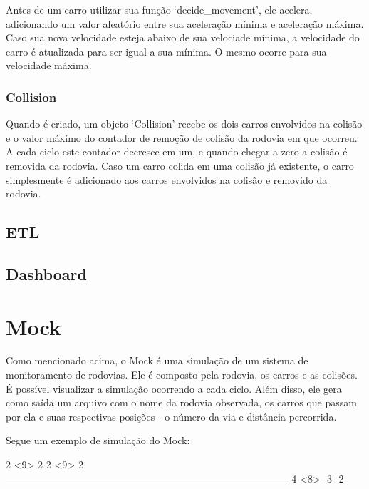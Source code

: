 \documentclass{article}
\def\openesc{\color{red}}
\def\closeesc{\color{black}}
\def\vbdelim{\catcode`<=\active\catcode`>=\active%
\def<{\openesc}
\def>{\closeesc}}
\begin{document}
    Antes de um carro utilizar sua função `decide\_movement', ele acelera, adicionando um valor aleatório entre sua
    aceleração mínima e aceleração máxima. Caso sua nova velocidade esteja abaixo de sua velociade mínima, a velocidade
    do carro é atualizada para ser igual a sua mínima. O mesmo ocorre para sua velocidade máxima.
    
    \subsubsection*{Collision}
    Quando é criado, um objeto `Collision' recebe os dois carros envolvidos na colisão e o valor máximo do contador de
    remoção de colisão da rodovia em que ocorreu. A cada ciclo este contador decresce em um, e quando chegar a zero a
    colisão é removida da rodovia. Caso um carro colida em uma colisão já existente, o carro simplesmente é adicionado
    aos carros envolvidos na colisão e removido da rodovia.

    \subsection*{ETL}
    \lipsum[1]

    \subsection*{Dashboard}
    \lipsum[2]

    \section{Mock}
    Como mencionado acima, o Mock é uma simulação de um sistema de monitoramento de rodovias.
    Ele é composto pela rodovia, os carros e as colisões. É possível visualizar a simulação
    ocorrendo a cada ciclo. Além disso, ele gera como saída um arquivo com o nome da rodovia
    observada, os carros que passam por ela e suas respectivas posições - o número da via e 
    distância percorrida.
    
    Segue um exemplo de simulação do Mock:

    \begin{verbnobox}[\vbdelim]
2                                                     <9>                                                                                                           2                                                                                                                                        
 2                                                        <9>                 
                               2                                            
------------------------------------------------------------------------------------
                                                 -4                         
                                                 <8>                        -3         
             -2
    \end{verbnobox}
    
\end{document}

